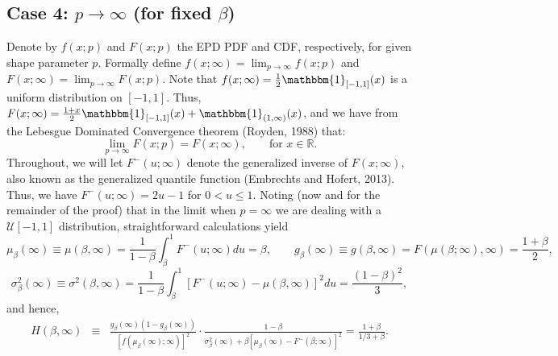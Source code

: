 \documentclass[11pt]{article}
\newcommand{\R}{{\mathbb R}}
\newcommand{\be}{\begin{equation}}
\newcommand{\ee}{\end{equation}}
\newcommand{\bas}{\begin{eqnarray*}}
\newcommand{\eas}{\end{eqnarray*}}
\newcommand{\indicator}[1]{\mathbbm{1}_{{#1}}}
\newcommand{\nc}{\normalcolor}
\begin{document}
\subsection*{Case 4: $p \rightarrow \infty$ (for fixed $\beta$)}
Denote by $f(x;p)$  and $F(x;p)$ the EPD PDF and CDF, respectively, for given shape
parameter $p$. Formally define $f(x;\infty) = \lim_{p \rightarrow \infty} f(x;p)$ and
$F(x;\infty) = \lim_{p \rightarrow \infty} F(x;p)$.  Note that
$f(x;\infty) = \frac{1}{2}\indicator{[-1,1]}(x)$ is a uniform
distribution on $[-1,1]$.  Thus, $F(x;\infty) =
\frac{1+x}{2}\indicator{[-1,1]}(x) + \indicator{(1,\infty)}(x)$,  and
we have from the Lebesgue Dominated Convergence theorem (Royden, 1988)
that: 
\be\label{F-converges-as-p-infty}
\lim_{p \rightarrow \infty}F(x;p) = F(x;\infty), \qquad\text{for }x\in\R. 
\ee 
\nc Throughout, we will let $F^{-}(u;\infty)$
denote the generalized inverse of $F(x;\infty)$, also known as the
generalized quantile function (Embrechts and Hofert, 2013). Thus, we
have $F^{-}(u;\infty) = 2u-1$ for $0 < u \le 1$.  Noting (now and
for the remainder of the proof) that in the
limit when $p=\infty$ we are dealing with a $\mathcal{U}[-1,1]$
distribution, \nc straightforward calculations yield 
\[
\mu_{\beta}(\infty) \equiv \mu(\beta,\infty) =
\frac{1}{1-\beta}\int_{\beta}^1 F^{-}(u;\infty) du = \beta, \qquad
g_{\beta}(\infty) \equiv g(\beta,\infty)= F(\mu(\beta;\infty),\infty)
= \frac{1+\beta}{2}, 
\]
\[
\sigma_{\beta}^2(\infty) \equiv \sigma^2(\beta,\infty) = \frac{1}{1-\beta}\int_{\beta}^1 [F^{-}(u;\infty) - \mu(\beta,\infty)]^2 du = \frac{(1-\beta)^2}{3},
\]
and hence, 
\bas
H(\beta,\infty) &\equiv& \frac{g_{\beta}(\infty)(1-g_{\beta}(\infty))}{[f(\mu_{\beta}(\infty);\infty)]^2}\cdot \frac{1-\beta}{\sigma_{\beta}^2(\infty) + \beta[\mu_{\beta}(\infty) - F^{-}(\beta;\infty)]^2} = \frac{1+\beta}{1/3 + \beta}.
\eas
\end{document}
